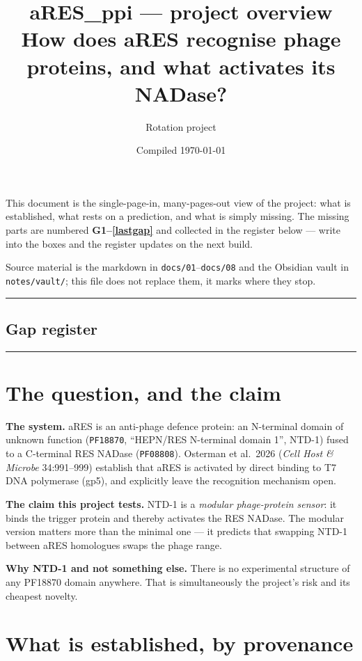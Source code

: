 \documentclass[11pt,a4paper]{article}
\title{\textbf{aRES\_ppi — project overview}\\[2pt]
       \large How does aRES recognise phage proteins, and what activates its NADase?}
\author{Rotation project}
\date{Compiled \today}
\makeatletter
\newcommand{\listofgaps}{\subsection*{Gap register}\@starttoc{gaps}}
\makeatother
\begin{document}
\maketitle

\noindent
This document is the single-page-in, many-pages-out view of the project: what is established, what
rests on a prediction, and what is simply missing. The missing parts are numbered
\textbf{\textcolor{gaprule}{G1--\ref{lastgap}}} and collected in the register below --- write into
the boxes and the register updates on the next build.

\medskip
\noindent
Source material is the markdown in \texttt{docs/01}--\texttt{docs/08} and the Obsidian vault in
\texttt{notes/vault/}; this file does not replace them, it marks where they stop.

\vspace{6pt}
\hrule
\listofgaps
\hrule

\section{The question, and the claim}

\textbf{The system.} aRES is an anti-phage defence protein: an N-terminal domain of unknown
function (\texttt{PF18870}, ``HEPN/RES N-terminal domain 1'', NTD-1) fused to a C-terminal RES
NADase (\texttt{PF08808}). Osterman et al.\ 2026 (\textit{Cell Host \& Microbe} 34:991--999)
establish that aRES is activated by direct binding to T7 DNA polymerase (gp5), and explicitly leave
the recognition mechanism open.

\textbf{The claim this project tests.} NTD-1 is a \emph{modular phage-protein sensor}: it binds the
trigger protein and thereby activates the RES NADase. The modular version matters more than the
minimal one --- it predicts that swapping NTD-1 between aRES homologues swaps the phage range.

\textbf{Why NTD-1 and not something else.} There is no experimental structure of any PF18870 domain
anywhere. That is simultaneously the project's risk and its cheapest novelty.

\section{What is established, by provenance}
\end{document}
